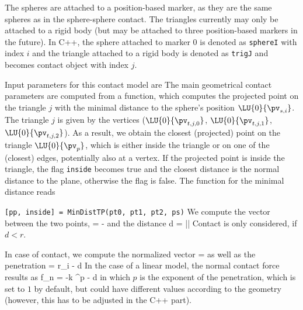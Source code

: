 The spheres are attached to a position-based marker, as they are the same spheres as in the sphere-sphere contact.
The triangles currently may only be attached to a rigid body (but may be attached to three position-based markers in the future).
%
In C++, the sphere attached to marker 0 is denoted as \texttt{sphereI} with index $i$ and the triangle attached to a rigid body is denoted as \texttt{trigJ} and becomes contact object with index $j$.

Input parameters for this contact model are
\finishTable
\vspace{6pt}
The main geometrical contact parameters are computed from a function, which computes the projected point on the triangle $j$ with the minimal distance to the sphere's position $\LU{0}{\pv_{s,i}}$. The triangle $j$ is given by the vertices ($\LU{0}{\pv_{t,j,0}}$, $\LU{0}{\pv_{t,j,1}}$, $\LU{0}{\pv_{t,j,2}}$).
As a result, we obtain the closest (projected) point on the triangle $\LU{0}{\pv_{p}}$, which is either inside the triangle or on one of the (closest) edges, potentially also at a vertex. If the projected point is inside the triangle, the flag \texttt{inside} becomes true and the closest distance is the normal distance to the plane, otherwise the flag is false.
The function for the minimal distance reads
\bi
  \item[] \texttt{[pp, inside] = MinDistTP(pt0, pt1, pt2, ps)}
\ei
We compute the vector between the two points,
\be
   =  - 
\ee
and the distance 
\be
  d = ||
\ee
Contact is only considered, if $d < r$.

In case of contact, we compute the normalized vector
\be
   =  
\ee
as well as the penetration
\be
  \Delta = r_i - d
\ee
In the case of a linear model, the normal contact force results as
\be
  f_n = -k \cdot \Delta^p - d \cdot \dot \Delta
\ee
in which $p$ is the exponent of the penetration, which is set to $1$ by default, but could have different values according to the geometry (however, this has to be adjusted in the C++ part).

